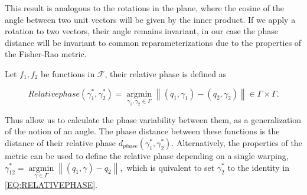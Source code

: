 This result is analogous to the rotations in the plane, where the cosine of
the angle between two unit vectors will be given by the inner product.
If we apply a rotation to two vectors, their angle remains invariant, in our
case the phase distance will be invariant to common reparameterizations due to
the properties of the Fisher-Rao metric.

Let $f_1, f_2$ be functions in $\mathcal{F}$, their relative phase is defined as

\begin{equation}[EQ:RELATIVEPHASE]{Relative phase}
\left(\gamma_{1}^{*}, \gamma_{2}^{*}\right)=\underset{\gamma_{1}, \gamma_{2} \in \Gamma}{\operatorname{argmin}}\left\|\left(q_{1}, \gamma_{1}\right)-\left(q_{2}, \gamma_{2}\right)\right\| \in \Gamma \times \Gamma.
\end{equation}

Thus allow us to calculate the phase variability between them,
as a generalization of the notion of an angle. The phase distance between these
functions is the distance of their relative phase
$d_{phase} (\gamma_{1}^{*}, \gamma_{2}^{*})$. Alternatively, the properties of
the metric can be used to define the relative phase depending on a single warping,
$
\gamma_{12}^{*}=\underset{\gamma \in \Gamma}{\operatorname{argmin}}\left\|\left(q_{1}, \gamma \right)- q_{2}\right\|,
$
which is quivalent to set $\gamma_2^*$ to the identity in \ref{EQ:RELATIVEPHASE}.
